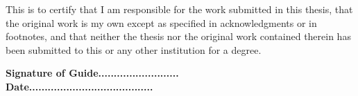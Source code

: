 \cleardoublepage


\begin{acknowledgements}

This is to certify that I am responsible for the work submitted in this thesis, that the original work is my own except as specified in acknowledgments or in footnotes, and that neither the thesis nor the original work contained therein has been submitted to this or any other institution for a degree.

\vskip 1in
\textbf{Signature of Guide..........................}\\
\vskip 5mm
\textbf{Date........................................}
\end{acknowledgements}